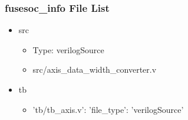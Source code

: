 \subsubsection{fusesoc\_info File List}
\begin{itemize}
\item src
	\begin{itemize}
	\item[$\space$] Type: verilogSource
	\item src/axis\_data\_width\_converter.v
	\end{itemize}
\item tb
	\begin{itemize}
	\item {'tb/tb\_axis.v': {'file\_type': 'verilogSource'}}
	\end{itemize}
\end{itemize}
